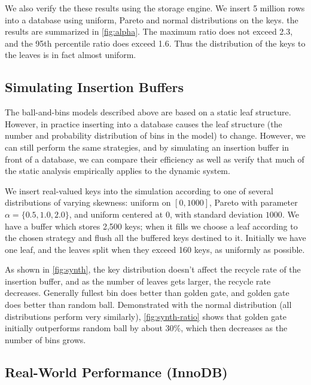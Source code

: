 

We also verify the these results using the \innodb{} storage engine. We insert
5 million rows into a database using uniform, Pareto and normal distributions
on the keys. the results are summarized in \cref{fig:alpha}. The maximum ratio
does not exceed 2.3, and the 95th percentile ratio does exceed 1.6. Thus the
distribution of the keys to the leaves is in fact almost uniform.

\subsection{Simulating Insertion Buffers}\label{sec:br-exp-synthetic}

The ball-and-bins models described above are based on a static leaf structure.
However, in practice inserting into a database causes the leaf structure (the
number and probability distribution of bins in the model) to change. However,
we can still perform the same strategies, and by simulating an insertion buffer
in front of a database, we can compare their efficiency as well as verify that
much of the static analysis empirically applies to the dynamic system.

We insert real-valued keys into the simulation according to one of several
distributions of varying skewness: uniform on $[0,1000]$, Pareto with parameter
$\alpha=\{0.5,1.0,2.0\}$, and uniform centered at 0, with standard deviation
$1000$. We have a buffer which stores 2,500 keys; when it fills we choose a
leaf according to the chosen strategy and flush all the buffered keys destined
to it. Initially we have one leaf, and the leaves split when they exceed 160
keys, as uniformly as possible. 

As shown in \cref{fig:synth}, the key distribution doesn't affect the recycle
rate of the insertion buffer, and as the number of leaves gets larger, the
recycle rate decreases. Generally fullest bin does better than golden gate, and
golden gate does better than random ball. Demonstrated with the normal
distribution (all distributions perform very similarly), \cref{fig:synth-ratio}
shows that golden gate initially outperforms random ball by about 30\%, which
then decreases as the number of bins grows.



\subsection{Real-World Performance (InnoDB)}\label{sec:br-exp-innodb}

